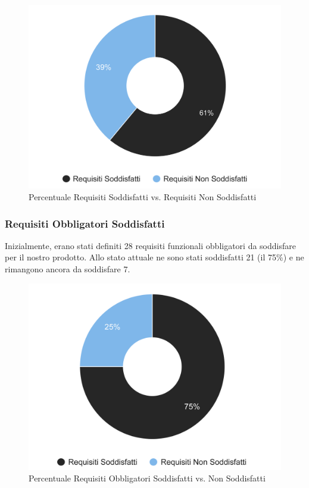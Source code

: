 \begin{figure}[H]
    \centering
    \includegraphics[scale=0.7]{Contenuto/Immagini/ReqSoddisfatti.png}
    \caption{Percentuale Requisiti Soddisfatti vs. Requisiti Non Soddisfatti}
\end{figure}

\subsubsection{Requisiti Obbligatori Soddisfatti}

Inizialmente, erano stati definiti 28 requisiti funzionali obbligatori da soddisfare per il nostro prodotto. Allo stato attuale ne sono stati soddisfatti 21 (il 75\%) e ne rimangono ancora da soddisfare 7.

\begin{figure}[H]
    \centering
    \includegraphics[scale=0.7]{Contenuto/Immagini/ReqObbligatoriSodd.png}
    \caption{Percentuale Requisiti Obbligatori Soddisfatti vs. Non Soddisfatti}
\end{figure}